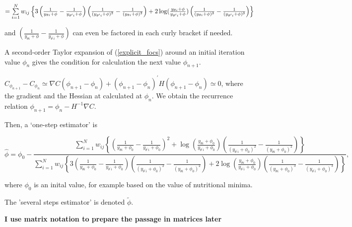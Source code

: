 \documentclass[a4paper,notitlepage,thmsb,11pt]{article}
\begin{document}
$=\sum\limits_{i=1}^{N}w_{ij}\left\{ 3\left( \frac{1}{y_{\theta i}+\phi }-%
\frac{1}{y_{\theta ^{\prime }i}+\phi }\right) \left( \frac{1}{(y_{\theta
^{\prime }i}+\phi )^{2}}-\frac{1}{(y_{\theta i}+\phi )^{2}}\right) +2\log (%
\frac{y_{\theta i}+\phi }{y_{\theta ^{\prime }i}+\phi })\left( \frac{1}{%
(y_{\theta i}+\phi )^{3}}-\frac{1}{(y_{\theta ^{\prime }i}+\phi )^{3}}%
\right) \right\} $

and $\left( \frac{1}{y_{\theta i}+\phi }-\frac{1}{y_{\theta ^{\prime
}i}+\phi }\right) $ can even be factored in each curly bracket if needed.

A second-order Taylor expansion of (\ref{explicit_focs}) around an initial
iteration value $\phi _{n}$ gives the condition for calculation the next
value $\phi _{n+1}$.

\bigskip 

$C_{\phi _{n+1}}-C_{\phi _{n}}\simeq \nabla C(\phi _{n+1}-\phi _{n})+(\phi
_{n+1}-\phi _{n})^{\prime }H(\phi _{n+1}-\phi _{n})\simeq 0$, where the
gradient and the Hessian at calculated at $\phi _{n}$. We obtain the
recurrence relation $\phi _{n+1}=\phi _{n}-H^{-1}\nabla C$.

\bigskip 

Then, a `one-step estimator' is 

\begin{equation}
\hat{\phi}=\phi _{0}-\frac{\sum\limits_{i=1}^{N}w_{ij}\left\{ \left( \frac{1%
}{y_{\theta i}+\phi _{0}}-\frac{1}{y_{\theta ^{\prime }i}+\phi _{0}}\right)
^{2}+\log (\frac{y_{\theta i}+\phi _{0}}{y_{\theta ^{\prime }i}+\phi _{0}}%
)\left( \frac{1}{(y_{\theta ^{\prime }i}+\phi _{0})^{2}}-\frac{1}{(y_{\theta
i}+\phi _{0})^{2}}\right) \right\} }{\sum\limits_{i=1}^{N}w_{ij}\left\{
3\left( \frac{1}{y_{\theta i}+\phi _{0}}-\frac{1}{y_{\theta ^{\prime
}i}+\phi _{0}}\right) \left( \frac{1}{(y_{\theta ^{\prime }i}+\phi _{0})^{2}}%
-\frac{1}{(y_{\theta i}+\phi _{0})^{2}}\right) +2\log (\frac{y_{\theta
i}+\phi _{0}}{y_{\theta ^{\prime }i}+\phi _{0}})\left( \frac{1}{(y_{\theta
i}+\phi _{0})^{3}}-\frac{1}{(y_{\theta ^{\prime }i}+\phi _{0})^{3}}\right)
\right\} },  \label{1step_estimator}
\end{equation}

where $\phi _{0}$ is an inital value, for example based on the value of
nutritional minima.

The 'several steps estimator' is denoted $\tilde{\phi}$. 

\textbf{I use matrix notation to prepare the passage in matrices later}
\end{document}
